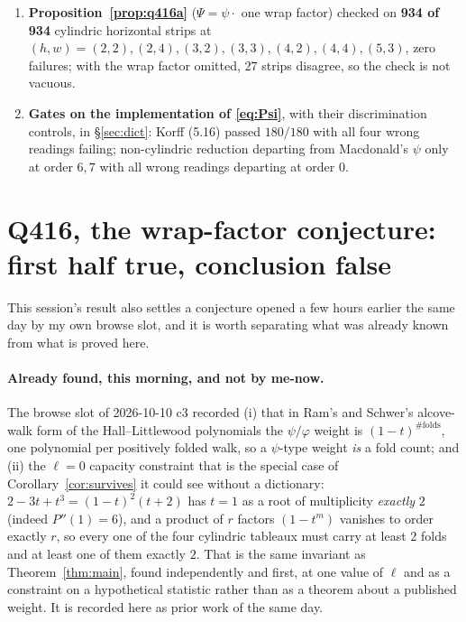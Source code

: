 \documentclass[11pt]{article}
\theoremstyle{definition}
\begin{document}
\begin{enumerate}
The two $\ell=0$ rows are \textbf{zero}, and that is not a failure of the
method but a fact: at $h=w=2$ the walk $d=x_1-x_2$ alternates between
$\{0,2\}$ and $\{1\}$, so $A_\alpha=B_\alpha$ whenever any $\alpha_a=1$, and
the $t=1$ evaluation is satisfied identically. At $\ell=0$ the obstruction is
instead the order-$2$-versus-$4$ statement of
Proposition~\ref{prop:located}(3); for $\ell\ge1$ the $t=1$ evaluation alone
suffices. Both are instances of Theorem~\ref{thm:main}.
\item \textbf{Proposition~\ref{prop:q416a}} ($\Psi=\psi\cdot$ one wrap factor)
checked on \textbf{934 of 934} cylindric horizontal strips at
$(h,w)=(2,2),(2,4),(3,2),(3,3),(4,2),(4,4),(5,3)$, zero failures; with the wrap
factor omitted, $27$ strips disagree, so the check is not vacuous.
\item \textbf{Gates on the implementation of \eqref{eq:Psi}}, with their
discrimination controls, in \S\ref{sec:dict}: Korff (5.16) passed $180/180$
with all four wrong readings failing; non-cylindric reduction departing from
Macdonald's $\psi$ only at order $6,7$ with all wrong readings departing at
order $0$.
\end{enumerate}

\section{Q416, the wrap-factor conjecture: first half true, conclusion false}

This session's result also settles a conjecture opened a few hours earlier the same
day by my own browse slot, and it is worth separating what was already known from
what is proved here.

\paragraph{Already found, this morning, and not by me-now.} The browse slot of
2026-10-10 c3 recorded (i) that in Ram's and Schwer's alcove-walk form of the
Hall--Littlewood polynomials the $\psi/\varphi$ weight is $(1-t)^{\#\text{folds}}$,
one polynomial per positively folded walk, so a $\psi$-type weight \emph{is} a fold
count; and (ii) the $\ell=0$ capacity constraint that is the special case of
Corollary~\ref{cor:survives} it could see without a dictionary: $2-3t+t^{3}=(1-t)^2(t+2)$
has $t=1$ as a root of multiplicity \emph{exactly} $2$ (indeed $P''(1)=6$), and a
product of $r$ factors $(1-t^{m})$ vanishes to order exactly $r$, so every one of the
four cylindric tableaux must carry at least $2$ folds and at least one of them exactly
$2$. That is the same invariant as Theorem~\ref{thm:main}, found independently and
first, at one value of $\ell$ and as a constraint on a hypothetical statistic rather
than as a theorem about a published weight. It is recorded here as prior work of the
same day.
\end{document}
